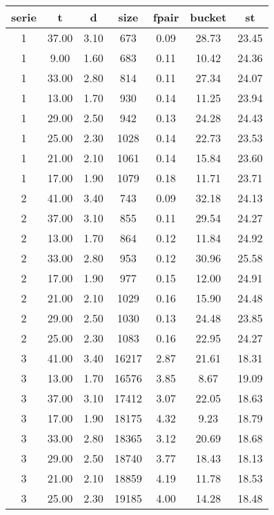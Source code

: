 \begin{tabular}{|c|c|c|c|c|c|c|}
\hline
\textbf{serie} & \textbf{t} & \textbf{d} & \textbf{size} & \textbf{fpair} & \textbf{bucket} & \textbf{st}\\
\hline
1 & 37.00 & 3.10 & 673 & 0.09 & 28.73 & 23.45\\
\hline
1 & 9.00 & 1.60 & 683 & 0.11 & 10.42 & 24.36\\
\hline
1 & 33.00 & 2.80 & 814 & 0.11 & 27.34 & 24.07\\
\hline
1 & 13.00 & 1.70 & 930 & 0.14 & 11.25 & 23.94\\
\hline
1 & 29.00 & 2.50 & 942 & 0.13 & 24.28 & 24.43\\
\hline
1 & 25.00 & 2.30 & 1028 & 0.14 & 22.73 & 23.53\\
\hline
1 & 21.00 & 2.10 & 1061 & 0.14 & 15.84 & 23.60\\
\hline
1 & 17.00 & 1.90 & 1079 & 0.18 & 11.71 & 23.71\\
\hline
2 & 41.00 & 3.40 & 743 & 0.09 & 32.18 & 24.13\\
\hline
2 & 37.00 & 3.10 & 855 & 0.11 & 29.54 & 24.27\\
\hline
2 & 13.00 & 1.70 & 864 & 0.12 & 11.84 & 24.92\\
\hline
2 & 33.00 & 2.80 & 953 & 0.12 & 30.96 & 25.58\\
\hline
2 & 17.00 & 1.90 & 977 & 0.15 & 12.00 & 24.91\\
\hline
2 & 21.00 & 2.10 & 1029 & 0.16 & 15.90 & 24.48\\
\hline
2 & 29.00 & 2.50 & 1030 & 0.13 & 24.48 & 23.85\\
\hline
2 & 25.00 & 2.30 & 1083 & 0.16 & 22.95 & 24.27\\
\hline
3 & 41.00 & 3.40 & 16217 & 2.87 & 21.61 & 18.31\\
\hline
3 & 13.00 & 1.70 & 16576 & 3.85 & 8.67 & 19.09\\
\hline
3 & 37.00 & 3.10 & 17412 & 3.07 & 22.05 & 18.63\\
\hline
3 & 17.00 & 1.90 & 18175 & 4.32 & 9.23 & 18.79\\
\hline
3 & 33.00 & 2.80 & 18365 & 3.12 & 20.69 & 18.68\\
\hline
3 & 29.00 & 2.50 & 18740 & 3.77 & 18.43 & 18.13\\
\hline
3 & 21.00 & 2.10 & 18859 & 4.19 & 11.78 & 18.53\\
\hline
3 & 25.00 & 2.30 & 19185 & 4.00 & 14.28 & 18.48\\
\hline
\end{tabular}
